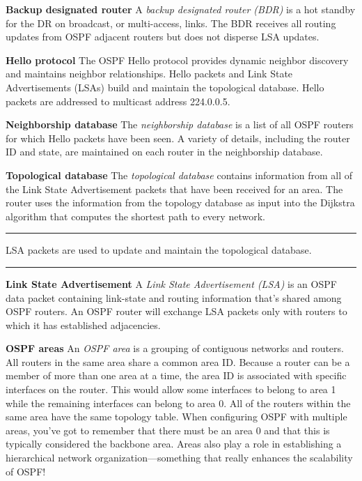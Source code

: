 \protect\hypertarget{c18.xhtmlux5cux23Page_750}{}{}\textbf{Backup
designated router} A \emph{backup designated router (BDR)} is a hot
standby for the DR on broadcast, or multi-access, links. The BDR
receives all routing updates from OSPF adjacent routers but does not
disperse LSA updates.

\textbf{Hello protocol} The OSPF Hello protocol provides dynamic
neighbor discovery and maintains neighbor relationships. Hello packets
and Link State Advertisements (LSAs) build and maintain the topological
database. Hello packets are addressed to multicast address 224.0.0.5.

\textbf{Neighborship database} The \emph{neighborship database} is a
list of all OSPF routers for which Hello packets have been seen. A
variety of details, including the router ID and state, are maintained on
each router in the neighborship database.

\textbf{Topological database} The \emph{topological database} contains
information from all of the Link State Advertisement packets that have
been received for an area. The router uses the information from the
topology database as input into the Dijkstra algorithm that computes the
shortest path to every network.

\begin{center}\rule{0.5\linewidth}{0.5pt}\end{center}

LSA packets are used to update and
maintain the topological database.

\begin{center}\rule{0.5\linewidth}{0.5pt}\end{center}

\textbf{Link State Advertisement} A \emph{Link State Advertisement
(LSA)} is an OSPF data packet containing link-state and routing
information that's shared among OSPF routers. An OSPF router will
exchange LSA packets only with routers to which it has established
adjacencies.

\textbf{OSPF areas} An \emph{OSPF area} is a grouping of contiguous
networks and routers. All routers in the same area share a common area
ID. Because a router can be a member of more than one area at a time,
the area ID is associated with specific interfaces on the router. This
would allow some interfaces to belong to area 1 while the remaining
interfaces can belong to area 0. All of the routers within the same area
have the same topology table. When configuring OSPF with multiple areas,
you've got to remember that there must be an area 0 and that this is
typically considered the backbone area. Areas also play a role in
establishing a hierarchical network organization---something that really
enhances the scalability of OSPF!

